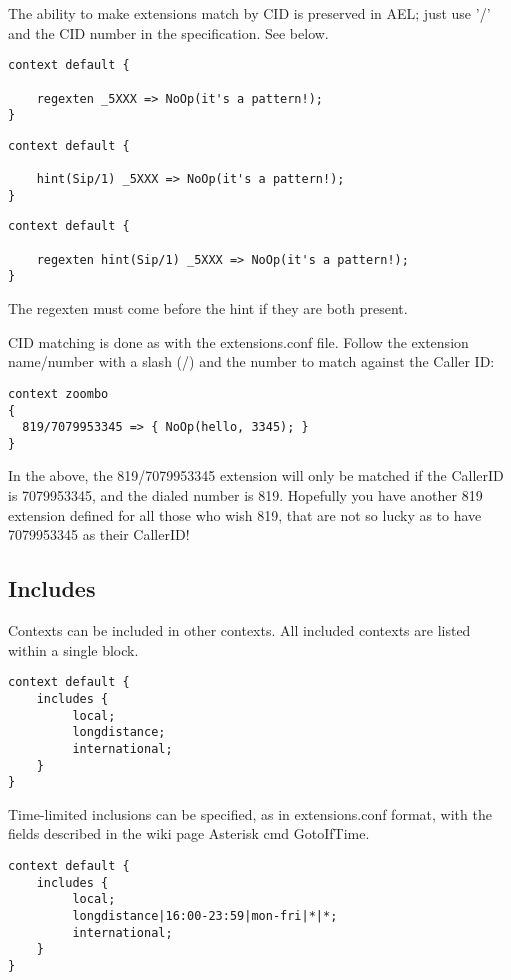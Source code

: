 {The ability to make extensions match by CID is preserved in
AEL; just use '/' and the CID number in the specification. See below.

\begin{verbatim}
context default {

    regexten _5XXX => NoOp(it's a pattern!);
}
\end{verbatim}

\begin{verbatim}
context default {

    hint(Sip/1) _5XXX => NoOp(it's a pattern!);
}
\end{verbatim}

\begin{verbatim}
context default {

    regexten hint(Sip/1) _5XXX => NoOp(it's a pattern!);
}
\end{verbatim}

The regexten must come before the hint if they are both present.

CID matching is done as with the extensions.conf file. Follow the extension
name/number with a slash (/) and the number to match against the Caller ID:

\begin{verbatim}
context zoombo 
{
  819/7079953345 => { NoOp(hello, 3345); }
}
\end{verbatim}

In the above,  the 819/7079953345 extension will only be matched if the
CallerID is 7079953345, and the dialed number is 819. Hopefully you have
another 819 extension defined for all those who wish 819, that are not so lucky
as to have 7079953345 as their CallerID!


\subsection{Includes}

Contexts can be included in other contexts. All included contexts are
listed within a single block.

\begin{verbatim}
context default {
    includes {
         local;
         longdistance;
         international;
    }
}
\end{verbatim}

Time-limited inclusions can be specified, as in extensions.conf
format, with the fields described in the wiki page Asterisk cmd
GotoIfTime.

\begin{verbatim}
context default {
    includes {
         local;
         longdistance|16:00-23:59|mon-fri|*|*;
         international;
    }
}
\end{verbatim}

}
